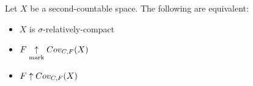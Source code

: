 


\begin{cor}
  Let $X$ be a second-countable space. The following are equivalent:
  \begin{itemize}
    \item $X$ is $\sigma$-relatively-compact
    \item $F \underset{\text{mark}}{\uparrow} Cov_{C,F}(X)$
    \item $F \uparrow Cov_{C,F}(X)$
  \end{itemize}
\end{cor}

